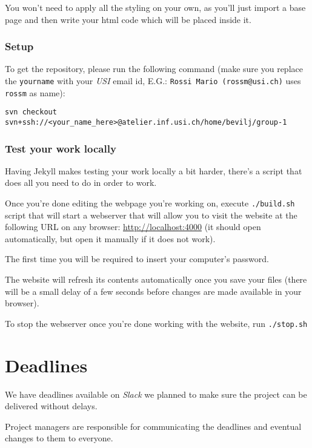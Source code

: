 \documentclass[hidelinks,12pt,a4paper,numbers=enddot]{scrartcl}
\begin{document}
You won't need to apply all the styling on your own, as you'll just
import a base page and then write your html code which will be placed inside it.

\subsubsection{Setup}\label{setup}

To get the repository, please run the following command (make sure you
replace the \texttt{yourname} with your \emph{USI} email id,
E.G.: \texttt{Rossi\ Mario\ (rossm@usi.ch)} uses
\texttt{rossm} as name):

\begin{verbatim}
svn checkout svn+ssh://<your_name_here>@atelier.inf.usi.ch/home/bevilj/group-1
\end{verbatim}

\subsubsection{Test your work locally}\label{test-your-work-locally}

Having Jekyll makes testing your work locally a bit harder, there's a
script that does all you need to do in order to work.

Once you're done editing the webpage you're working on, execute
\texttt{./build.sh} script that will start a webserver that will allow you
to visit the website at the following URL on any browser:
\url{http://localhost:4000} (it should open automatically, but open it
manually if it does not work).

The first time you will be required to insert your computer's password.

The website will refresh its contents automatically once you save your
files (there will be a small delay of a few seconds before changes are
made available in your browser).

To stop the webserver once you're done working with the website,
run \texttt{./stop.sh}

\section{Deadlines}\label{deadlines}

We have deadlines available on \emph{Slack} we planned to make sure the
project can be delivered without delays.

Project managers are responsible for communicating the deadlines
and eventual changes to them to everyone.\\
\end{document}
